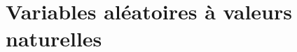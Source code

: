 \section{Variables aléatoires à valeurs naturelles} %
\label{sec:Variables aléatoires à valeurs naturelles}


